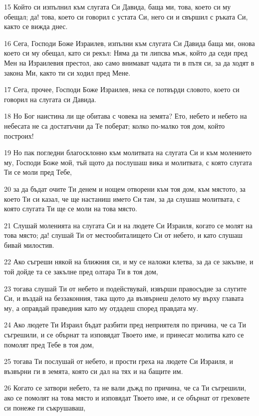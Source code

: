 \par 15 Който си изпълнил към слугата Си Давида, баща ми, това, което си му обещал; да! това, което си говорил с устата Си, него си и свършил с ръката Си, както се вижда днес.
\par 16 Сега, Господи Боже Израилев, изпълни към слугата Си Давида баща ми, онова което си му обещал, като си рекъл: Няма да ти липсва мъж, който да седи пред Мен на Израилевия престол, ако само внимават чадата ти в пътя си, за да ходят в закона Ми, както ти си ходил пред Мене.
\par 17 Сега, прочее, Господи Боже Израилев, нека се потвърди словото, което си говорил на слугата си Давида.
\par 18 Но Бог наистина ли ще обитава с човека на земята? Ето, небето и небето на небесата не са достатъчни да Те поберат; колко по-малко тоя дом, който построих!
\par 19 Но пак погледни благосклонно към молитвата на слугата Си и към молението му, Господи Боже мой, тъй щото да послушаш вика и молитвата, с която слугата Ти се моли пред Тебе,
\par 20 за да бъдат очите Ти денем и нощем отворени към тоя дом, към мястото, за което Ти си казал, че ще настаниш името Си там, за да слушаш молитвата, с която слугата Ти ще се моли на това място.
\par 21 Слушай моленията на слугата Си и на людете Си Израиля, когато се молят на това място; да! слушай Ти от местообиталището Си от небето, и като слушаш бивай милостив.
\par 22 Ако съгреши някой на ближния си, и му се наложи клетва, за да се закълне, и той дойде та се закълне пред олтара Ти в тоя дом,
\par 23 тогава слушай Ти от небето и подействувай, извърши правосъдие за слугите Си, и въздай на беззаконния, така щото да възвърнеш делото му върху главата му, а оправдай праведния като му отдадеш според правдата му.
\par 24 Ако людете Ти Израил бъдат разбити пред неприятеля по причина, че са Ти съгрешили, и се обърнат та изповядат Твоето име, и принесат молитва като се помолят пред Тебе в тоя дом,
\par 25 тогава Ти послушай от небето, и прости греха на людете Си Израиля, и възвърни ги в земята, която си дал на тях и на бащите им.
\par 26 Когато се затвори небето, та не вали дъжд по причина, че са Ти съгрешили, ако се помолят на това място и изповядат Твоето име, и се обърнат от греховете си понеже ги съкрушаваш,
